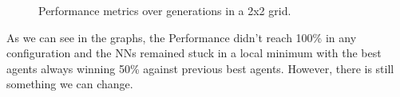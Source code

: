 \documentclass[11pt]{report}
\begin{document}
\begin{enumerate}
\begin{figure}[htbp!]
\begin{adjustbox}{valign=c,margin=-2cm 0pt 0pt 0pt}
\begin{minipage}{1.1\textwidth}
\begin{subfigure}[b]{0.45\textwidth}
                \end{subfigure}


            \end{minipage}
        \end{adjustbox}
        \caption{Performance metrics over generations in a 2x2 grid.}
        \label{fig:performances-2}


    \end{figure}
    As we can see in the graphs, the Performance didn't reach 100\% in any configuration and the NNs remained stuck in a local minimum with the best agents always winning 50\% against previous best agents.
    However, there is still something we can change.

\end{enumerate}
\end{document}
